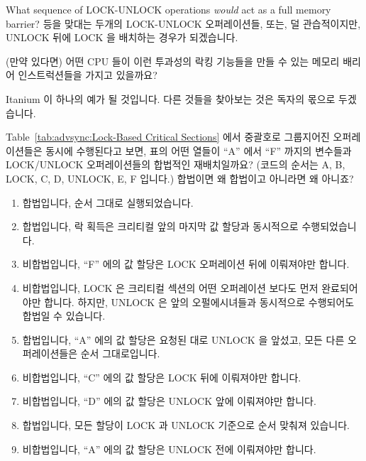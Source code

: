 \begin{enumerate}
	What sequence of LOCK-UNLOCK operations \emph{would}
	act as a full memory barrier?
	\fi
\QuickA{}
	등을 맞대는 두개의 LOCK-UNLOCK 오퍼레이션들, 또는, 덜 관습적이지만,
	UNLOCK 뒤에 LOCK 을 배치하는 경우가 되겠습니다.

\QuickQ{}
	(만약 있다면) 어떤 CPU 들이 이런 투과성의 락킹 기능들을 만들 수 있는
	메모리 배리어 인스트럭션들을 가지고 있을까요?

\QuickA{}
	Itanium 이 하나의 예가 될 것입니다.
	다른 것들을 찾아보는 것은 독자의 몫으로 두겠습니다.

\QuickQ{}
	Table~\ref{tab:advsync:Lock-Based Critical Sections} 에서 중괄호로
	그룹지어진 오퍼레이션들은 동시에 수행된다고 보면, 표의 어떤 열들이
	``A'' 에서 ``F'' 까지의 변수들과 LOCK/UNLOCK 오퍼레이션들의 합법적인
	재배치일까요?
	(코드의 순서는 A, B, LOCK, C, D, UNLOCK, E, F 입니다.)
	합법이면 왜 합법이고 아니라면 왜 아니죠?

\QuickA{}
	\begin{enumerate}
	\item	합법입니다, 순서 그대로 실행되었습니다.
	\item	합법입니다, 락 획득은 크리티컬 앞의 마지막 값 할당과 동시적으로
		수행되었습니다.
	\item	비합법입니다, ``F'' 에의 값 할당은 LOCK 오퍼레이션 뒤에
		이뤄져야만 합니다.
	\item	비합법입니다, LOCK 은 크리티컬 섹션의 어떤 오퍼레이션 보다도
		먼저 완료되어야만 합니다.
		하지만, UNLOCK 은 앞의 오펄에시녀들과 동시적으로 수행되어도
		합법일 수 있습니다.
	\item	합법입니다, ``A'' 에의 값 할당은 요청된 대로 UNLOCK 을 앞섰고,
		모든 다른 오퍼레이션들은 순서 그대로입니다.
	\item	비합법입니다, ``C'' 에의 값 할당은 LOCK 뒤에 이뤄져야만 합니다.
	\item	비합법입니다, ``D'' 에의 값 할당은 UNLOCK 앞에 이뤄져야만
		합니다.
	\item	합법입니다, 모든 할당이 LOCK 과 UNLOCK 기준으로 순서 맞춰져
		있습니다.
	\item	비합법입니다, ``A'' 에의 값 할당은 UNLOCK 전에 이뤄져야만
		합니다.
	\end{enumerate}
	\iffalse


\end{enumerate}
